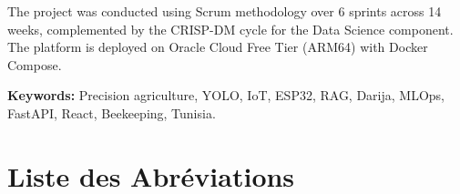 The project was conducted using Scrum methodology over 6 sprints across 14 weeks, complemented by the CRISP-DM cycle for the Data Science component. The platform is deployed on Oracle Cloud Free Tier (ARM64) with Docker Compose.

\medskip
\noindent\textbf{Keywords:} Precision agriculture, YOLO, IoT, ESP32, RAG, Darija, MLOps, FastAPI, React, Beekeeping, Tunisia.

\cleardoublepage

\tableofcontents
\cleardoublepage

\listoffigures
{}
\cleardoublepage

\listoftables
{}
\cleardoublepage

\chapter*{Liste des Abréviations}
\thispagestyle{empty}

